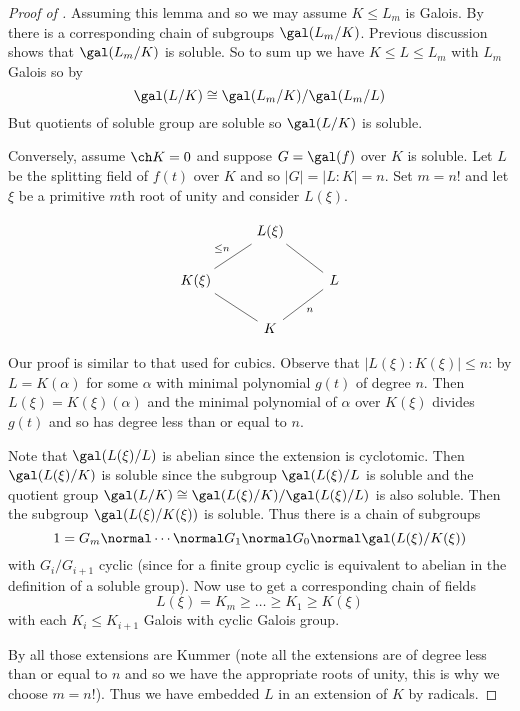 \documentclass[a4paper]{article}
\begin{document}
\begin{proof}[Proof of ]
  Assuming this lemma and so we may assume \(K \leq L_m\) is Galois. By  there is a corresponding chain of subgroups \(\gal(L_m/K)\). Previous discussion shows that \(\gal(L_m/K)\) is soluble. So to sum up we have \(K \leq L \leq L_m\) with \(L_m\) Galois so by 
  \[
    \gal(L/K) \cong \gal(L_m/K)/\gal(L_m/L)
  \]
  But quotients of soluble group are soluble so \(\gal(L/K)\) is soluble.

  Conversely, assume \(\ch K = 0\) and suppose \(G = \gal(f)\) over \(K\) is soluble. Let \(L\) be the splitting field of \(f(t)\) over \(K\) and so \(|G| = |L:K| = n\). Set \(m = n!\) and let \(\xi\) be a primitive \(m\)th root of unity and consider \(L(\xi)\).

  \[
    \begin{tikzcd}
      & L(\xi) \ar[dl, dash, "\leq n"'] \ar[dr, dash] & \\
      K(\xi) \ar[dr, dash] & & L \ar[dl, dash, "n"] \\
      & K &
    \end{tikzcd}
  \]

  Our proof is similar to that used for cubics. Observe that \(|L(\xi):K(\xi)| \leq n\): by  \(L = K(\alpha)\) for some \(\alpha\) with minimal polynomial \(g(t)\) of degree \(n\). Then \(L(\xi) = K(\xi)(\alpha)\) and the minimal polynomial of \(\alpha\) over \(K(\xi)\) divides \(g(t)\) and so has degree less than or equal to \(n\).

  Note that \(\gal(L(\xi)/L)\) is abelian since the extension is cyclotomic. Then \(\gal(L(\xi)/K)\) is soluble since the subgroup \(\gal(L(\xi)/L\) is soluble and the quotient group \(\gal(L/K) \cong \gal(L(\xi)/K)/\gal(L(\xi)/L)\) is also soluble. Then the subgroup \(\gal(L(\xi)/K(\xi))\) is soluble. Thus there is a chain of subgroups
  \[
    1 = G_m \normal \cdots \normal G_1 \normal G_0 \normal \gal(L(\xi)/K(\xi))
  \]
  with \(G_i/G_{i + 1}\) cyclic (since for a finite group cyclic is equivalent to abelian in the definition of a soluble group). Now use  to get a corresponding chain of fields
  \[
    L(\xi) = K_m \geq \dots \geq K_1\geq K(\xi)
  \]
  with each \(K_i \leq K_{i + 1}\) Galois with cyclic Galois group.

  By  all those extensions are Kummer (note all the extensions are of degree less than or equal to \(n\) and so we have the appropriate roots of unity, this is why we choose \(m = n!\)). Thus we have embedded \(L\) in an extension of \(K\) by radicals.
\end{proof}
\end{document}
